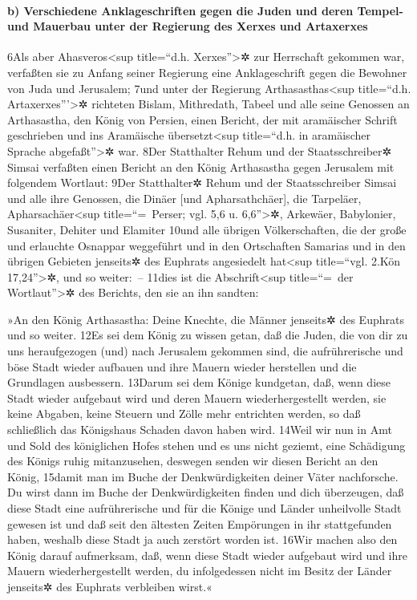 \hypertarget{b-verschiedene-anklageschriften-gegen-die-juden-und-deren-tempel--und-mauerbau-unter-der-regierung-des-xerxes-und-artaxerxes}{%
\paragraph{b) Verschiedene Anklageschriften gegen die Juden und deren
Tempel- und Mauerbau unter der Regierung des Xerxes und
Artaxerxes}\label{b-verschiedene-anklageschriften-gegen-die-juden-und-deren-tempel--und-mauerbau-unter-der-regierung-des-xerxes-und-artaxerxes}}

6Als aber Ahasveros\textless sup title=``d.h. Xerxes''\textgreater✲ zur
Herrschaft gekommen war, verfaßten sie zu Anfang seiner Regierung eine
Anklageschrift gegen die Bewohner von Juda und Jerusalem; 7und unter der
Regierung Arthasasthas\textless sup title=``d.h.
Artaxerxes'''\textgreater✲ richteten Bislam, Mithredath, Tabeel und alle
seine Genossen an Arthasastha, den König von Persien, einen Bericht, der
mit aramäischer Schrift geschrieben und ins Aramäische
übersetzt\textless sup title=``d.h. in aramäischer Sprache
abgefaßt''\textgreater✲ war. 8Der Statthalter Rehum und der
Staatsschreiber✲ Simsai verfaßten einen Bericht an den König Arthasastha
gegen Jerusalem mit folgendem Wortlaut: 9Der Statthalter✲ Rehum und der
Staatsschreiber Simsai und alle ihre Genossen, die Dinäer {[}und
Apharsathchäer{]}, die Tarpeläer, Apharsachäer\textless sup
title=``=~Perser; vgl. 5,6 u. 6,6''\textgreater✲, Arkewäer, Babylonier,
Susaniter, Dehiter und Elamiter 10und alle übrigen Völkerschaften, die
der große und erlauchte Osnappar weggeführt und in den Ortschaften
Samarias und in den übrigen Gebieten jenseits✲ des Euphrats angesiedelt
hat\textless sup title=``vgl. 2.Kön 17,24''\textgreater✲, und so
weiter:~-- 11dies ist die Abschrift\textless sup title=``=~der
Wortlaut''\textgreater✲ des Berichts, den sie an ihn sandten:

»An den König Arthasastha: Deine Knechte, die Männer jenseits✲ des
Euphrats und so weiter. 12Es sei dem König zu wissen getan, daß die
Juden, die von dir zu uns heraufgezogen (und) nach Jerusalem gekommen
sind, die aufrührerische und böse Stadt wieder aufbauen und ihre Mauern
wieder herstellen und die Grundlagen ausbessern. 13Darum sei dem Könige
kundgetan, daß, wenn diese Stadt wieder aufgebaut wird und deren Mauern
wiederhergestellt werden, sie keine Abgaben, keine Steuern und Zölle
mehr entrichten werden, so daß schließlich das Königshaus Schaden davon
haben wird. 14Weil wir nun in Amt und Sold des königlichen Hofes stehen
und es uns nicht geziemt, eine Schädigung des Königs ruhig mitanzusehen,
deswegen senden wir diesen Bericht an den König, 15damit man im Buche
der Denkwürdigkeiten deiner Väter nachforsche. Du wirst dann im Buche
der Denkwürdigkeiten finden und dich überzeugen, daß diese Stadt eine
aufrührerische und für die Könige und Länder unheilvolle Stadt gewesen
ist und daß seit den ältesten Zeiten Empörungen in ihr stattgefunden
haben, weshalb diese Stadt ja auch zerstört worden ist. 16Wir machen
also den König darauf aufmerksam, daß, wenn diese Stadt wieder aufgebaut
wird und ihre Mauern wiederhergestellt werden, du infolgedessen nicht im
Besitz der Länder jenseits✲ des Euphrats verbleiben wirst.«

